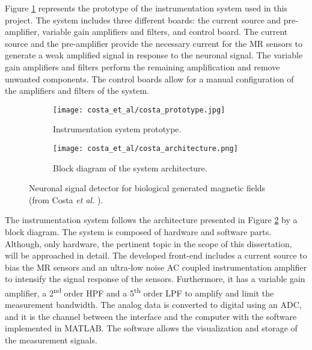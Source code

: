 Figure \ref{figure:costa-prototype} represents the prototype of the instrumentation system used in this project. The system includes three different boards: the current source and pre-amplifier, variable gain amplifiers and filters, and control board. The current source and the pre-amplifier provide the necessary current for the \ac{MR} sensors to generate a weak amplified signal in response to the neuronal signal. The variable gain amplifiers and filters perform the remaining amplification and remove unwanted components. The control boards allow for a manual configuration of the amplifiers and filters of the system.

\begin{figure}[!ht]
    \centering
    \begin{subfigure}[b]{.48\textwidth}
        \centering
        \texttt{[image: costa\_et\_al/costa\_prototype.jpg]}
        \caption{Instrumentation system prototype.}
        \label{figure:costa-prototype}
    \end{subfigure}
    \hfill
    \centering
    \begin{subfigure}[b]{.48\textwidth}
        \centering
        \texttt{[image: costa\_et\_al/costa\_architecture.png]}
        \caption{Block diagram of the system architecture.}
        \label{figure:costa-architecture}
    \end{subfigure}
    \caption{Neuronal signal detector for biological generated magnetic fields (from Costa \textit{et al.} \cite{TIM.2013.2296417}).}
    \label{figure:costa-system}
\end{figure}

The instrumentation system follows the architecture presented in Figure \ref{figure:costa-architecture} by a block diagram. The system is composed of hardware and software parts. Although, only hardware, the pertinent topic in the scope of this dissertation, will be approached in detail. The developed front-end includes a current source to bias the \ac{MR} sensors and an ultra-low noise \ac{AC} coupled instrumentation amplifier to intensify the signal response of the sensors. Furthermore, it has a variable gain amplifier, a 2\textsuperscript{nd} order \ac{HPF} and a 5\textsuperscript{th} order \ac{LPF} to amplify and limit the measurement bandwidth. The analog data is converted to digital using an \ac{ADC}, and it is the channel between the interface and the computer with the software implemented in MATLAB. The software allows the visualization and storage of the measurement signals.

